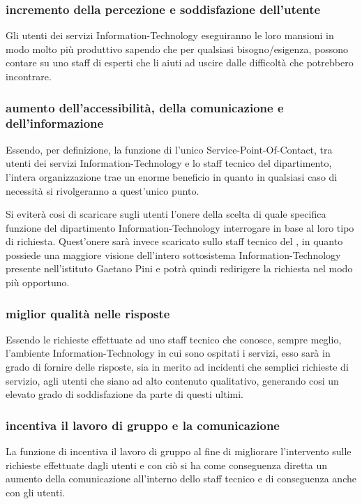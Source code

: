 \subsubsection[Incremento della percezione e soddisfazione dell'utente]{incremento della percezione e soddisfazione dell'utente}
Gli utenti dei servizi \acs{Information-Technology} eseguiranno le loro mansioni in modo molto più produttivo sapendo che per qualsiasi bisogno/esigenza, possono contare su uno staff di esperti che li aiuti ad uscire dalle difficoltà che potrebbero incontrare.

\subsubsection[Aumento dell'accessibilità, della comunicazione e dell'informazione]{aumento dell'accessibilità, della comunicazione e dell'informazione}
Essendo, per definizione, la funzione di  l'unico \ac{Service-Point-Of-Contact}, tra utenti dei servizi \acs{Information-Technology} e lo staff tecnico del dipartimento, l'intera organizzazione trae un enorme beneficio in quanto in qualsiasi caso di necessità si rivolgeranno a quest'unico punto.

Si eviterà cosi di scaricare sugli utenti l'onere della scelta di quale specifica funzione del dipartimento \acs{Information-Technology} interrogare in base al loro tipo di richiesta. Quest'onere sarà invece scaricato sullo staff tecnico del , in quanto possiede una maggiore visione dell'intero sottosistema \acs{Information-Technology} presente nell'istituto Gaetano Pini e potrà quindi redirigere la richiesta nel modo più opportuno.

\subsubsection[Miglior qualità nelle risposte]{miglior qualità nelle risposte}
Essendo le richieste effettuate ad uno staff tecnico che conosce, sempre meglio, l'ambiente \acs{Information-Technology} in cui sono ospitati i servizi, esso sarà in grado di fornire delle risposte, sia in merito ad incidenti che semplici richieste di servizio, agli utenti che siano ad alto contenuto qualitativo, generando cosi un elevato grado di soddisfazione da parte di questi ultimi.

\subsubsection[Incentiva il lavoro di gruppo e la comunicazione]{incentiva il lavoro di gruppo e la comunicazione}
La funzione di  incentiva il lavoro di gruppo al fine di migliorare l'intervento sulle richieste effettuate dagli utenti e con ciò si ha come conseguenza diretta un aumento della comunicazione all'interno dello staff tecnico e di conseguenza anche con gli utenti.

